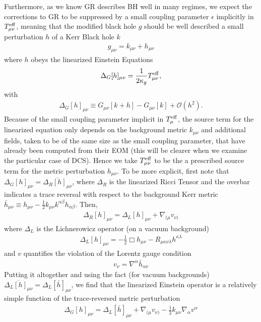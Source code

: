 \documentclass[aps,prd,amsmath,showpacs,amssymb,superscriptaddress,nofootinbib,longbibliography,eqsecnum,preprintnumbers]{revtex4-1}
\begin{document}
Furthermore, as we know GR describes BH well in many regimes, we expect the corrections to GR to be suppressed by a small coupling parameter $\epsilon$ implicitly in $T^{\rm eff}_{\mu \nu}$, meaning that the modified black hole $g$ should be well described a small perturbation $h$ of a Kerr Black hole $k$
\begin{align}
g_{\mu \nu}=k_{\mu\nu}+ h_{\mu\nu}
\end{align}
where $h$ obeys the linearized Einstein Equations 
\begin{align}
\Delta_G[h]_{\mu \nu}=\frac{1}{2\kappa_g}T^{\rm eff}_{\mu\nu}, \label{eq:LE}
\end{align}
with
\begin{align}
\Delta_{G}[h]_{\mu \nu}\equiv G_{\mu \nu}[k+h]-G_{\mu \nu}[k]+\mathcal{O}(h^2).
\end{align}
Because of the small coupling parameter implicit in $T^{\rm eff}_{\mu}$, the source term for the linearized equation only depends on the background metric $k_{\mu\nu}$
and additional fields, taken to be of the same size as the small coupling parameter, that have already been computed from their EOM (this will be clearer when we examine the particular case of DCS). Hence we take $T^{\rm eff}_{\mu \nu}$ to be the a prescribed source term for the metric perturbation $h_{\mu\nu}$.
To be more explicit, first note that $\Delta_G[h]_{\mu \nu} =\overline {\Delta_R[h]_{\mu \nu}} $, where $\Delta_R$ is the linearized Ricci Tensor and the overbar indicates a trace reversal with respect to the background Kerr metric $\bar h_{\mu\nu}\equiv h_{\mu \nu}-\frac{1}{2}k_{\mu \nu}k^{\alpha\beta}h_{\alpha \beta}$. Then,
\begin{align}
\Delta_R[h]_{\mu \nu}=\Delta_L[h]_{\mu \nu}+\nabla_{(\mu}v_{\nu)}
\end{align}
where $\Delta_L$ is the Lichnerowicz operator \cite{Dias:2015nua} (on a vacuum background)
\begin{align}
\Delta_L[h]_{\mu \nu}=-\frac{1}{2}\Box h_{\mu \nu}-R_{\mu\kappa \nu \lambda}h^{\kappa \lambda}
\end{align}
and $v$ quantifies the violation of the Lorentz gauge condition
\begin{align}
v_{\nu}=\nabla^{\alpha}\bar h_{\alpha \nu}
\end{align}
Putting it altogether and using the fact (for vacuum backgrounds) $\overline{\Delta_L[h]_{\mu \nu}}=\Delta_L[\bar h]_{\mu \nu}$, we find that the linearized Einstein operator is a relatively simple function of the trace-reversed metric perturbation
\begin{align}
\Delta_{G}[h]_{\mu \nu}=\Delta_L[\bar h]_{\mu\nu}+\nabla_{(\mu}v_{\nu)}-\frac{1}{2}k_{\mu \nu}\nabla_\alpha v^\alpha
\end{align}
\end{document}
